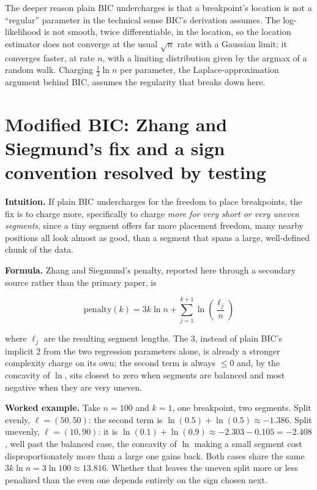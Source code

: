 \documentclass[11pt]{article}
\begin{document}
The deeper reason plain BIC undercharges is that a breakpoint's location is
not a ``regular'' parameter in the technical sense BIC's derivation
assumes. The log-likelihood is not smooth, twice differentiable, in the
location, so the location estimator does not converge at the usual
$\sqrt n$ rate with a Gaussian limit; it converges faster, at rate $n$, with
a limiting distribution given by the argmax of a random walk. Charging
$\frac{1}{2}\ln n$ per parameter, the Laplace-approximation argument behind
BIC, assumes the regularity that breaks down here.

\section{Modified BIC: Zhang and Siegmund's fix and a sign convention resolved by testing}
\label{sec:mbic}

\textbf{Intuition.} If plain BIC undercharges for the freedom to place
breakpoints, the fix is to charge more, specifically to charge \emph{more
for very short or very uneven segments}, since a tiny segment offers far
more placement freedom, many nearby positions all look almost as good, than
a segment that spans a large, well-defined chunk of the data.

\textbf{Formula.} Zhang and Siegmund's penalty, reported here through a
secondary source rather than the primary paper, is

\begin{equation}
\text{penalty}(k) = 3k \ln n + \sum_{j=1}^{k+1} \ln\!\left(\frac{\ell_j}{n}\right)
\end{equation}

where $\ell_j$ are the resulting segment lengths. The $3$, instead of plain
BIC's implicit $2$ from the two regression parameters alone, is already a
stronger complexity charge on its own; the second term is always $\le 0$
and, by the concavity of $\ln$, sits closest to zero when segments are
balanced and most negative when they are very uneven.

\textbf{Worked example.} Take $n=100$ and $k=1$, one breakpoint, two
segments. Split evenly, $\ell = (50, 50)$: the second term is
$\ln(0.5)+\ln(0.5) \approx -1.386$. Split unevenly, $\ell = (10, 90)$:
it is $\ln(0.1)+\ln(0.9) \approx -2.303-0.105=-2.408$, well past the
balanced case, the concavity of $\ln$ making a small segment
cost disproportionately more than a large one gains back. Both cases
share the same $3k\ln n = 3\ln 100 \approx 13.816$. Whether that leaves
the uneven split more or less penalized than the even one depends
entirely on the sign chosen next.
\end{document}
